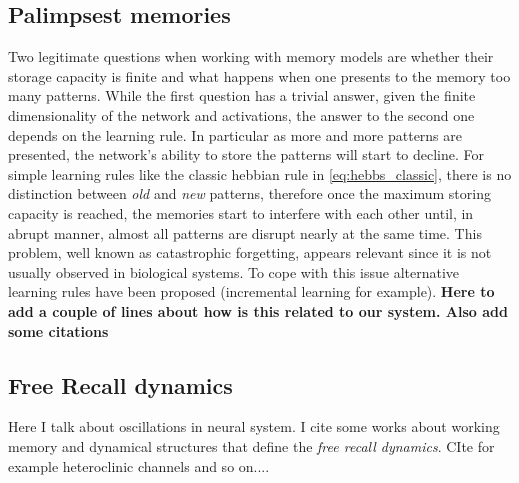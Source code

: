 \subsection{Palimpsest memories}
Two legitimate questions when working with memory models are whether their storage capacity is finite and what happens when one presents to the memory too many patterns. While the first question has a trivial answer, given the finite dimensionality of the network and activations, the answer to the second one depends on the learning rule. In particular as more and more patterns are presented, the network's ability to store the patterns will start to decline. For simple learning rules like the classic hebbian rule in \eqref{eq:hebbs_classic}, there is no distinction between \textit{old} and \textit{new} patterns, therefore once the maximum storing capacity is reached, the memories start to interfere with each other until, in abrupt manner, almost all patterns are disrupt nearly at the same time. This problem, well known as catastrophic forgetting, appears relevant since it is not usually observed in biological systems. To cope with this issue alternative learning rules have been proposed (incremental learning for example). \textbf{Here to add a couple of lines about how is this related to our system. Also add some citations}

\subsection{Free Recall dynamics}

Here I talk about oscillations in neural system. I cite some works about working memory and dynamical structures that define the \textit{free recall dynamics}. CIte for example heteroclinic channels and so on....